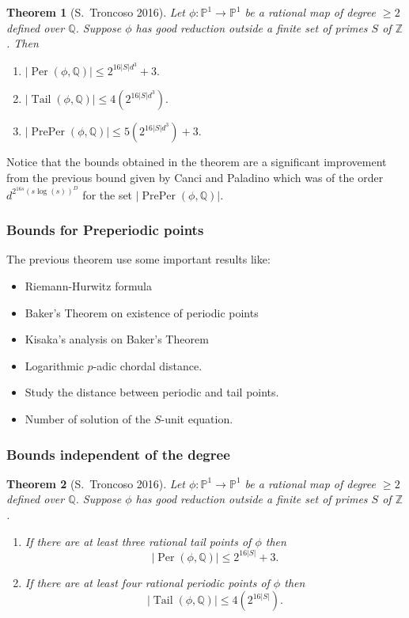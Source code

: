 \documentclass{beamer}
\def\jump{ \quad \\ \vspace{0.7cm} \pause}
\def\PP{{\mathbb P}}
\def\QQ{{\mathbb Q}}
\def\ZZ{{\mathbb Z}}
\DeclareMathOperator{\Tail}{Tail}
\DeclareMathOperator{\Per}{Per}
\DeclareMathOperator{\PrePer}{PrePer}
\theoremstyle{thmstyle}
\theoremstyle{thmstyle}
\newtheorem*{mythm}{Theorem}
\theoremstyle{mystyle}
\theoremstyle{qstnstyle}
\begin{document}
\begin{frame}
\begin{mythm}[S.\ Troncoso 2016]
Let $\phi : \PP^1\to\PP^1$ be a rational map of degree $\geq{2}$
defined over $\QQ$. Suppose $\phi$ has good reduction outside a finite set of primes $S$ of $\ZZ$. Then
\begin{enumerate}
\item [(a)] $|\Per(\phi,\QQ)| \leq  2^{16|S|d^3}+3.$

\item [(b)] $|\Tail(\phi,\QQ)| \leq  4(2^{16|S|d^3}) .$

\item [(c)] $|\PrePer(\phi,\QQ)| \leq 5(2^{16|S|d^3})+3.$

\end{enumerate}
\end{mythm}

Notice that the bounds obtained  in the theorem are a significant improvement from the previous bound given by Canci and Paladino which was of the order $\displaystyle d^{2^{16s}\left( s\log(s) \right)^{D}}$ for the set $|\PrePer(\phi,\QQ)|$.
\end{frame}


\begin{frame}
\frametitle{Bounds for Preperiodic points}

The previous theorem use some important results like:\pause
\jump
\begin{itemize}
\item Riemann-Hurwitz formula
\pause
\item  Baker's Theorem on existence of periodic points
\pause
\item Kisaka's analysis on Baker's Theorem
\pause
\item Logarithmic $p$-adic chordal distance.
\pause
\item Study the distance between periodic and tail points.
\pause
\item Number of solution of the $S$-unit equation.
\end{itemize}
\end{frame}


\begin{frame}
\frametitle{Bounds independent of the degree}
\begin{mythm}[S.\ Troncoso 2016]
Let $\phi : \PP^1\to\PP^1$ be a rational map of degree $\geq{2}$
defined over $\QQ$. Suppose $\phi$ has good reduction outside a finite set of primes $S$ of $\ZZ$.
\begin{enumerate}

\item [(a)] 
If there are at least three rational tail points of $\phi$ then
$$|\Per(\phi,\QQ)| \leq 2^{16|S|}+3. $$

\item [(b)]
If there are at least four rational periodic points of $\phi$ then
$$|\Tail(\phi,\QQ)| \leq 4(2^{16|S|}).$$
\end{enumerate}
\end{mythm}
\end{frame}
\end{document}
